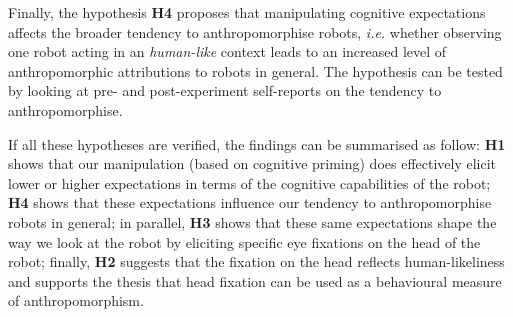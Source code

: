 \documentclass[lettersize, noapacite, twoside, HRI]{apa_HRI}
\newcommand{\ie}{\textit{i.e.}\xspace}
\newcommand{\h}[1]{\textbf{H#1}\xspace}
\begin{document}
Finally, the hypothesis \h{4} proposes that manipulating cognitive expectations
affects the broader tendency to anthropomorphise robots, \ie whether observing one
robot acting in an \emph{human-like} context leads to an increased level of
anthropomorphic attributions to robots in general. The hypothesis can be
tested by looking at pre- and post-experiment self-reports on the tendency to
anthropomorphise.

If all these hypotheses are verified, the findings can be summarised as follow:
\h{1} shows that our manipulation (based on cognitive priming) does effectively
elicit lower or higher expectations in terms of the cognitive capabilities of
the robot; \h{4} shows that these expectations influence our tendency to
anthropomorphise robots in general; in parallel, \h{3} shows that these same expectations
shape the way we look at the robot by eliciting specific eye fixations on the
head of the robot; finally, \h{2} suggests that the fixation on the head
reflects human-likeliness and supports the thesis that head fixation can be used
as a behavioural measure of anthropomorphism.

%
%
%
%
%
%
%
\end{document}

